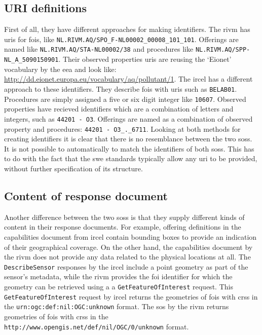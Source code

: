 \subsection{URI definitions}
\begin{sloppypar}
	First of all, they have different approaches for making identifiers. The \ac{rivm} has \acp{uri} for \acp{foi}, like \texttt{NL.RIVM.AQ/SPO\_F-NL00002\_00008\_101\_101}. Offerings are named like \texttt{NL.RIVM.AQ/STA-NL00002/38} and procedures like \texttt{NL.RIVM.AQ/SPP-NL\_A\_5090150901}. Their observed properties \acp{uri} are reusing the `Eionet' vocabulary by the \ac{eea} and look like: \url{http://dd.eionet.europa.eu/vocabulary/aq/pollutant/1}. The \ac{ircel} has a different approach to these identifiers. They describe \acp{foi} with \acp{uri} such as \texttt{BELAB01}. Procedures are simply assigned a five or six digit integer like \texttt{10607}. Observed properties have recieved identifiers which are a combination of letters and integers, such as \texttt{44201 - O3}. Offerings are named as a combination of observed property and procedures: \texttt{44201 - O3\_.\_6711}. Looking at both methods for creating identifiers it is clear that there is no resemblance between the two \aclp{sos}. It is not possible to automatically to match the identifiers of both \aclp{sos}. This has to do with the fact that the \ac{swe} standards typically allow  any \ac{uri} to be provided, without further specification of its structure. 
\end{sloppypar}

\subsection{Content of response document}
\begin{sloppypar}
Another difference between the two \aclp{sos} is that they supply different kinds of content in their response documents. For example, offering definitions in the capabilities document from \ac{ircel} contain bounding boxes to provide an indication of their geographical coverage. On the other hand, the capabilities document by the \ac{rivm} does not provide any data related to the physical locations at all. The \texttt{DescribeSensor} responses by the \ac{ircel} include a point geometry as part of the sensor's metadata, while the \ac{rivm} provides the \ac{foi} identifier for which the geometry can be retrieved using a a \texttt{GetFeatureOfInterest} request. This \texttt{GetFeatureOfInterest} request by \ac{ircel} returns the geometries of \acp{foi} with \acp{crs} in the \texttt{urn:ogc:def:nil:OGC:unknown} format. The \ac{sos} by the \ac{rivm} returns geometries of \acp{foi} with \acp{crs} in the \texttt{http://www.opengis.net/def/nil/OGC/0/unknown} format. 
\end{sloppypar}

